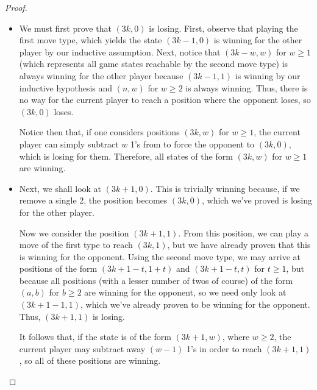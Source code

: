 \begin{solution}{3}
\begin{proof}
        \begin{itemize}
            \item We must first prove that \( (3k, 0) \) is losing. First,
                observe that playing the first move type, which yields the
                state \( (3k - 1, 0) \) is winning for the other player by our
                inductive assumption. Next, notice that \( (3k - w, w) \) for
                \( w \ge 1 \) (which represents all game states reachable by
                the second move type) is always winning for the other player
                because \( (3k - 1, 1) \) is winning by our inductive
                hypothesis and \( (n, w) \) for \( w \ge 2 \) is always
                winning. Thus, there is no way for the current player to reach
                a position where the opponent loses, so \( (3k, 0) \) loses.

                Notice then that, if one considers positions \( (3k, w) \) for
                \( w \ge 1 \), the current player can simply subtract \( w \)
                1's from to force the opponent to \( (3k, 0) \), which is
                losing for them. Therefore, all states of the form \( (3k, w)
                \) for \( w \ge 1 \) are winning.

            \item Next, we shall look at \( (3k + 1, 0) \). This is trivially
                winning because, if we remove a single 2, the position becomes
                \( (3k, 0) \), which we've proved is losing for the other
                player.

                Now we consider the position \( (3k + 1, 1) \). From this
                position, we can play a move of the first type to reach \( (3k,
                1) \), but we have already proven that this is winning for the
                opponent. Using the second move type, we may arrive at
                positions of the form \( (3k + 1 - t, 1 + t) \) and \( (3k + 1
                - t, t) \) for \( t \ge 1 \), but because all positions (with a
                lesser number of twos of course) of the form \( (a, b) \) for
                \( b \ge 2 \) are winning for the opponent, so we need only
                look at \( (3k + 1 - 1, 1) \), which we've already proven to be
                winning for the opponent. Thus, \( (3k + 1, 1) \) is losing.

                It follows that, if the state is of the form \( (3k + 1, w) \),
                where \( w \ge 2 \), the current player may subtract away \( (w
                - 1) \) 1's in order to reach \( (3k + 1, 1) \), so all of these
                positions are winning.


\end{itemize}
\end{proof}
\end{solution}
